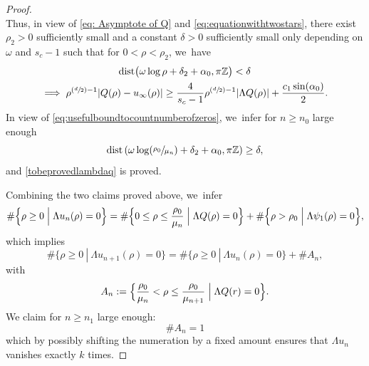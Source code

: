 \documentclass[10pt]{amsart}
\newcommand{\Psfrac}[2]{(\sfrac{#1}{#2})}
\theoremstyle{plain}
\theoremstyle{definition}
\begin{document}
\begin{proof}
\[\]
Thus, in view of \eqref{eq: Asymptote of Q} and \eqref{eq:equationwithtwostars}, there exist $\rho_2>0$ sufficiently small and a constant $\delta>0$ sufficiently small only depending on $\omega$ and $s_c-1$ such that for $0<\rho<\rho_2$, we~have
\begin{multline*}
\textrm{dist}\big(\omega\log\rho+\delta_2+\alpha_0, \pi\mathbb{Z}\big)<\delta\\
\implies \rho^{\Psfrac{d}{2}-1}|Q(\rho) - u_\infty(\rho)|\geq \frac{4}{s_c-1}\rho^{\Psfrac{d}{2}-1}|\Lambda Q(\rho)|+\frac{c_1\sin(\alpha_0)}{2}.
\end{multline*}
In view of \eqref{eq:usefulboundtocountnumberofzeros}, we~infer for $n\ge n_0$ large enough
\begin{equation}\label{eq:equationwithonestar}
\textrm{dist}\left(\omega\log(\sfrac{\rho_0}{\mu_n})+\delta_2+\alpha_0, \pi\mathbb{Z}\right)\geq \delta,
\end{equation}
and \eqref{tobeprovedlambdaq} is proved.

Combining the two claims proved above, we~infer
\[
\#\Big\{\rho\geq 0\Bigm|\Lambda u_n(\rho)=0\Big\}
= \#\Big\{0\leq \rho\leq \frac{\rho_0}{\mu_n}\Bigm|\Lambda Q(\rho)=0 \Big\}+ \#\Big\{\rho>\rho_0\Bigm|\Lambda\psi_1(\rho)=0\Big\},
\]
which implies
\[
\#\{\rho\geq 0 \ | \ \Lambda u_{n+1}(\rho)=0\} = \#\{\rho\geq 0 \ | \ \Lambda u_n(\rho)=0\} + \# A_n,
\]
with
\[
A_n := \Big\{\frac{\rho_0}{\mu_n}< \rho\leq \frac{\rho_0}{\mu_{n+1}}\Bigm|\Lambda Q(r)=0 \Big\}.
\]
We claim for $n\geq n_1$ large enough:
\begin{equation}
\label{estcarajo}
\# A_n=1
\end{equation}
which by possibly shifting the numeration by a fixed amount ensures that $\Lambda u_n$ vanishes exactly $k$ times.


\end{proof}
\end{document}
